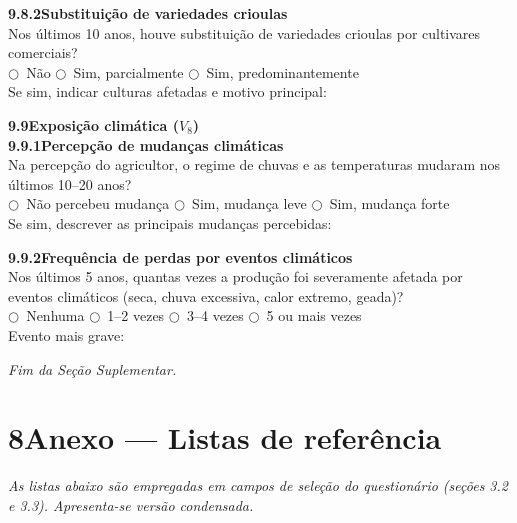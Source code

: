 \medskip\noindent\textbf{9.8.2\quad Substituição de variedades crioulas}\\[2pt]
Nos últimos 10 anos, houve substituição de variedades crioulas por cultivares comerciais?\\
$\bigcirc$~Não \quad $\bigcirc$~Sim, parcialmente \quad $\bigcirc$~Sim, predominantemente\\[2pt]
Se sim, indicar culturas afetadas e motivo principal: \dotfill\\[2pt]\dotfill

\bigskip\noindent\textbf{9.9\quad Exposição climática ($V_8$)}\\[6pt]

\noindent\textbf{9.9.1\quad Percepção de mudanças climáticas}\\[2pt]
Na percepção do agricultor, o regime de chuvas e as temperaturas mudaram nos últimos 10--20 anos?\\
$\bigcirc$~Não percebeu mudança \quad $\bigcirc$~Sim, mudança leve \quad $\bigcirc$~Sim, mudança forte\\[2pt]
Se sim, descrever as principais mudanças percebidas: \dotfill\\[2pt]\dotfill

\medskip\noindent\textbf{9.9.2\quad Frequência de perdas por eventos climáticos}\\[2pt]
Nos últimos 5 anos, quantas vezes a produção foi severamente afetada por eventos climáticos (seca, chuva excessiva, calor extremo, geada)?\\
$\bigcirc$~Nenhuma \quad $\bigcirc$~1--2 vezes \quad $\bigcirc$~3--4 vezes \quad $\bigcirc$~5 ou mais vezes\\[2pt]
Evento mais grave: \dotfill

\bigskip\noindent\textit{Fim da Seção Suplementar.}

\section{8\quad Anexo --- Listas de referência}

\textit{As listas abaixo são empregadas em campos de seleção do questionário (seções 3.2 e 3.3). Apresenta-se versão condensada.}

